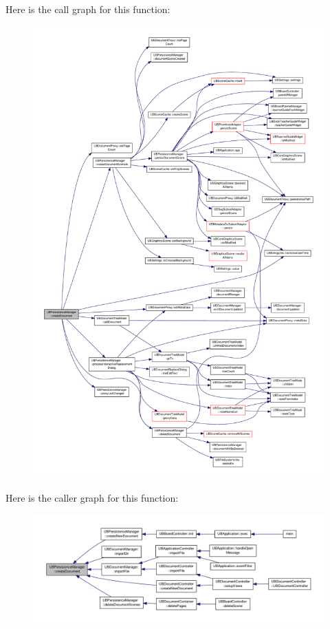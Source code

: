 Here is the call graph for this function\-:
\nopagebreak
\begin{figure}[H]
\begin{center}
\leavevmode
\includegraphics[width=350pt]{d0/dd5/class_u_b_persistence_manager_a47e4dc44bdbeab6ac217d51419000ca3_cgraph}
\end{center}
\end{figure}




Here is the caller graph for this function\-:
\nopagebreak
\begin{figure}[H]
\begin{center}
\leavevmode
\includegraphics[width=350pt]{d0/dd5/class_u_b_persistence_manager_a47e4dc44bdbeab6ac217d51419000ca3_icgraph}
\end{center}
\end{figure}



